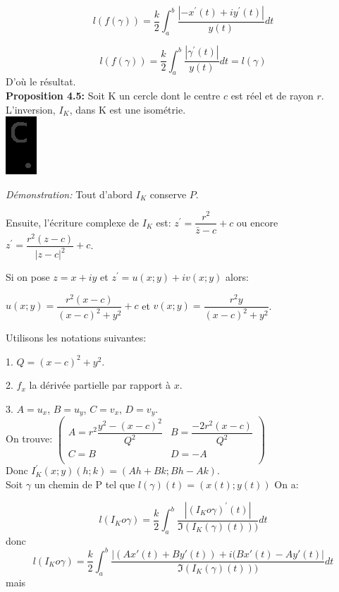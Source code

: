 \documentclass[a4paper, 12pt, twoside]{book}
\begin{document}
$$l(f(\gamma))= \dfrac{k}{2}\int_{a}^{b} \dfrac{|-x^{'}(t)+iy^{'}(t)|}{y(t)} dt$$


$$l(f(\gamma))= \dfrac{k}{2}\int_{a}^{b} \dfrac{|\gamma^{'}(t)|}{y(t)} dt=l(\gamma)$$ D'où le résultat.\\



\textbf{Proposition 4.5:} Soit K un cercle dont le centre $c$ est réel et de rayon $r$. L'inversion, $I_{K}$, dans K est une isométrie.\\

\includegraphics[scale=0.8]{figures/hyper2.eps} 

\textit{Démonstration:} Tout d'abord $I_{K}$ conserve $P$.\

Ensuite, l'écriture complexe de $I_{K}$ est: $z^{'}=\dfrac{r^{2}}{\bar{z}-c}+c$ ou encore  $z^{'}=\dfrac{r^{2}(z-c)}{|z-c|^{2}}+c$.\

Si on pose $z=x+iy$ et $z^{'}=u(x;y)+iv(x;y)$ alors:\

$u(x;y)=\dfrac{r^{2}(x-c)}{(x-c)^{2}+y^{2}}+c$ et $v(x;y)=\dfrac{r^{2}y}{(x-c)^{2}+y^{2}}$.\

Utilisons les notations suivantes:\

1. $Q=(x-c)^{2}+y^{2}$.

2. $f_{x}$ la dérivée partielle par rapport à $x$.\

3. $A=u_{x}$, $B=u_{y}$, $C=v_{x}$, $D=v_{y}$.\\

On trouve: $\begin{pmatrix}

   A=r^{2}\dfrac{y^{2}-(x-c)^{2}}{Q^{2}} & B=\dfrac{-2r^{2}(x-c)}{Q^{2}} \\

   C=B & D=-A  \\

\end{pmatrix}$\\

Donc $I_{K}^{'}(x;y)(h;k)=(Ah+Bk; Bh-Ak)$.\\



Soit $\gamma$ un chemin de P tel que $l(\gamma)(t)=(x(t);y(t))$ On a:\

$$l(I_{K}o\gamma)= \dfrac{k}{2}\int_{a}^{b} \dfrac{|(I_{K}o\gamma)^{'}(t)|}{\Im(I_{K}(\gamma)(t)))} dt$$ donc
 $$l(I_{K}o\gamma)= \dfrac{k}{2}\int_{a}^{b} \dfrac{|(Ax'(t)+By'(t))+i(Bx'(t)-Ay'(t)|}{\Im(I_{K}(\gamma)(t)))} dt$$ mais\
 
\end{document}
